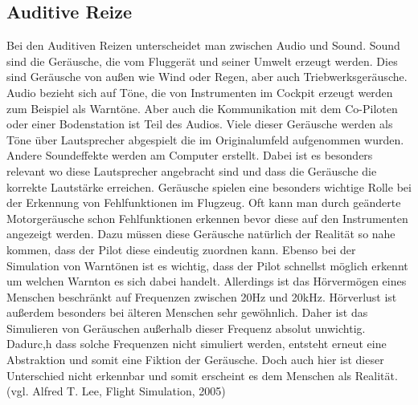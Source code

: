\documentclass[12pt]{article}
\begin{document}
\subsection{Auditive Reize}
Bei den Auditiven Reizen unterscheidet man zwischen Audio und Sound. Sound sind die Geräusche, die vom Fluggerät und seiner Umwelt erzeugt werden. Dies sind Geräusche von außen wie Wind oder Regen, aber auch Triebwerksgeräusche. Audio bezieht sich auf Töne, die von Instrumenten im Cockpit erzeugt werden zum Beispiel als Warntöne. Aber auch die Kommunikation mit dem Co-Piloten oder einer Bodenstation ist Teil des Audios. Viele dieser Geräusche werden als Töne über Lautsprecher abgespielt die im Originalumfeld aufgenommen wurden. Andere Soundeffekte werden am Computer erstellt.\newline
Dabei ist es besonders relevant wo diese Lautsprecher angebracht sind und dass die Geräusche die korrekte Lautstärke erreichen. \newline
Geräusche spielen eine besonders wichtige Rolle bei der Erkennung von Fehlfunktionen im Flugzeug. Oft kann man durch geänderte Motorgeräusche schon Fehlfunktionen erkennen bevor diese auf den Instrumenten angezeigt werden. Dazu müssen diese Geräusche natürlich der Realität so nahe kommen, dass der Pilot diese eindeutig zuordnen kann. Ebenso bei der Simulation von Warntönen ist es wichtig, dass der Pilot schnellst möglich erkennt um welchen Warnton es sich dabei handelt.\newline
Allerdings ist das Hörvermögen eines Menschen beschränkt auf Frequenzen zwischen 20Hz und 20kHz. Hörverlust ist außerdem besonders bei älteren Menschen sehr gewöhnlich. Daher ist das Simulieren von Geräuschen außerhalb dieser Frequenz absolut unwichtig. Dadurc,h dass solche Frequenzen nicht simuliert werden, entsteht erneut eine Abstraktion und somit eine Fiktion der Geräusche. Doch auch hier ist dieser Unterschied nicht erkennbar und somit erscheint es dem Menschen als Realität.
(vgl. Alfred T. Lee, Flight Simulation, 2005)\newline
\end{document}
